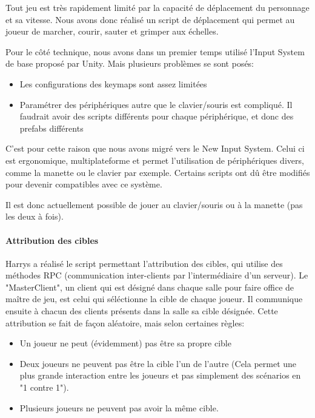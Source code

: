             Tout jeu est très rapidement limité par la capacité de déplacement du personnage et sa vitesse.
            Nous avons donc réalisé un script de déplacement qui permet au joueur de marcher, courir, sauter et grimper aux échelles.

            Pour le côté technique, nous avons dans un premier temps utilisé l'Input System de base proposé par Unity. Mais plusieurs problèmes se sont posés:
            \begin{itemize}
                \item Les configurations des keymaps sont assez limitées
                \item Paramétrer des périphériques autre que le clavier/souris est compliqué. Il faudrait avoir des scripts différents pour chaque périphérique, et donc des prefabs différents
            \end{itemize}
            C'est pour cette raison que nous avons migré vers le New Input System.
            Celui ci est ergonomique, multiplateforme et permet l'utilisation de périphériques divers, comme la manette ou le clavier par exemple.
            Certains scripts ont dû être modifiés pour devenir compatibles avec ce système.

            Il est donc actuellement possible de jouer au clavier/souris ou à la manette (pas les deux à fois).
            
        \paragraph{Attribution des cibles}
            
            Harrys a réalisé le script permettant l'attribution des cibles, qui utilise des méthodes RPC (communication inter-clients par l'intermédiaire d'un serveur). Le "MasterClient", un client qui est désigné dans chaque salle pour faire office de maître de jeu, est celui qui séléctionne la cible de chaque joueur. Il communique ensuite à chacun des clients présents dans la salle sa cible désignée. Cette attribution se fait de façon aléatoire, mais selon certaines règles:
            \begin{itemize}
                \item Un joueur ne peut (évidemment) pas être sa propre cible
                \item Deux joueurs ne peuvent pas être la cible l'un de l'autre (Cela permet une plus grande interaction entre les joueurs et pas simplement des scénarios en "1 contre 1").
                \item Plusieurs joueurs ne peuvent pas avoir la même cible.
            \end{itemize}
                

